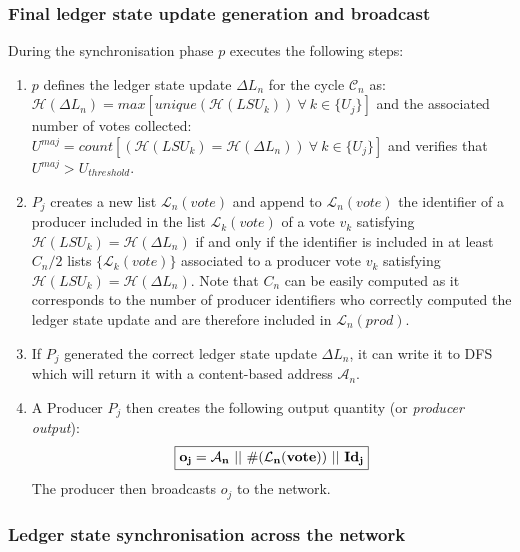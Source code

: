 \subsubsection{Final ledger state update generation and broadcast}


During the synchronisation phase $p$ executes the following steps:

\begin{enumerate}
\item $p$ defines the ledger state update $\Delta L_n$ for the cycle $\mathcal{C}_n$ as:\\
 $\mathcal{H}(\Delta L_n) = max[unique(\mathcal{H}(LSU_k))~\forall~k\in\{U_j\}]$ and the associated number of votes collected: $U^{maj} = count[(\mathcal{H}(LSU_k) = \mathcal{H}(\Delta L_n))~\forall~k\in\{U_j\}]$ and verifies that $U^{maj}> U_{threshold}$.
\item $P_j$ creates a new list $\mathcal{L}_{n}(vote)$ and append to $\mathcal{L}_{n}(vote)$ the identifier of a producer included in the list $\mathcal{L}_{k}(vote)$ of a vote $v_k$ satisfying $\mathcal{H}(LSU_k) = \mathcal{H}(\Delta L_n)$ if and only if the identifier is included in at least $C_n/2$ lists $\{\mathcal{L}_{k}(vote)\}$ associated to a producer vote $v_{k}$ satisfying $\mathcal{H}(LSU_k) = \mathcal{H}(\Delta L_n)$. Note that $C_n$ can be easily computed as it corresponds to the number of producer identifiers who correctly computed the ledger state update and are therefore included in $\mathcal{L}_{n}(prod)$.

\item If $P_j$ generated the correct ledger state update $\Delta L_n$, it can write it to DFS which will return it with a content-based address $\mathcal{A}_n$.
\item A Producer $P_j$ then creates the following output quantity (or \textit{producer output}):
\begin{equation}
\fbox{$\mathbf{o_{j} = \mathcal{A}_n~||~\#(\mathcal{L}_{n}(vote))~||~Id_j}$}
\label{eq:Hj}
\end{equation}
The producer then broadcasts $o_j$ to the network.
\end{enumerate}


\subsubsection{Ledger state synchronisation across the network}

